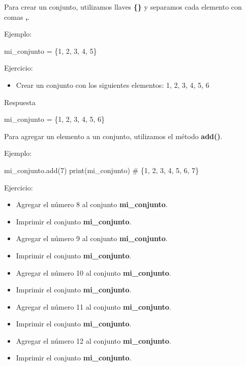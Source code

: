 \documentclass[
  a4paper,
  DIV=11,
  numbers=noendperiod,
  onepage,
  openany]{scrreprt}
\newenvironment{Shaded}{\begin{snugshade}}{\end{snugshade}}
\newcommand{\BuiltInTok}[1]{\textcolor[rgb]{0.00,0.23,0.31}{#1}}
\newcommand{\CommentTok}[1]{\textcolor[rgb]{0.37,0.37,0.37}{#1}}
\newcommand{\DecValTok}[1]{\textcolor[rgb]{0.68,0.00,0.00}{#1}}
\newcommand{\NormalTok}[1]{\textcolor[rgb]{0.00,0.23,0.31}{#1}}
\newcommand{\OperatorTok}[1]{\textcolor[rgb]{0.37,0.37,0.37}{#1}}
\providecommand{\tightlist}{%
  \setlength{\itemsep}{0pt}\setlength{\parskip}{0pt}}\usepackage{longtable,booktabs,array}
\begin{document}
Para crear un conjunto, utilizamos llaves \textbf{\{\}} y separamos cada
elemento con comas \textbf{,}.

Ejemplo:

\begin{Shaded}
\begin{Highlighting}[]
\NormalTok{mi\_conjunto }\OperatorTok{=}\NormalTok{ \{}\DecValTok{1}\NormalTok{, }\DecValTok{2}\NormalTok{, }\DecValTok{3}\NormalTok{, }\DecValTok{4}\NormalTok{, }\DecValTok{5}\NormalTok{\}}
\end{Highlighting}
\end{Shaded}

Ejercicio:

\begin{itemize}
\tightlist
\item
  Crear un conjunto con los siguientes elementos: 1, 2, 3, 4, 5, 6
\end{itemize}

Respuesta

\begin{Shaded}
\begin{Highlighting}[]
\NormalTok{mi\_conjunto }\OperatorTok{=}\NormalTok{ \{}\DecValTok{1}\NormalTok{, }\DecValTok{2}\NormalTok{, }\DecValTok{3}\NormalTok{, }\DecValTok{4}\NormalTok{, }\DecValTok{5}\NormalTok{, }\DecValTok{6}\NormalTok{\}}
\end{Highlighting}
\end{Shaded}

Para agregar un elemento a un conjunto, utilizamos el método
\textbf{add()}.

Ejemplo:

\begin{Shaded}
\begin{Highlighting}[]
\NormalTok{mi\_conjunto.add(}\DecValTok{7}\NormalTok{)}
\BuiltInTok{print}\NormalTok{(mi\_conjunto)  }\CommentTok{\# \{1, 2, 3, 4, 5, 6, 7\}}
\end{Highlighting}
\end{Shaded}

Ejercicio:

\begin{itemize}
\tightlist
\item
  Agregar el número 8 al conjunto \textbf{mi\_conjunto}.
\item
  Imprimir el conjunto \textbf{mi\_conjunto}.
\item
  Agregar el número 9 al conjunto \textbf{mi\_conjunto}.
\item
  Imprimir el conjunto \textbf{mi\_conjunto}.
\item
  Agregar el número 10 al conjunto \textbf{mi\_conjunto}.
\item
  Imprimir el conjunto \textbf{mi\_conjunto}.
\item
  Agregar el número 11 al conjunto \textbf{mi\_conjunto}.
\item
  Imprimir el conjunto \textbf{mi\_conjunto}.
\item
  Agregar el número 12 al conjunto \textbf{mi\_conjunto}.
\item
  Imprimir el conjunto \textbf{mi\_conjunto}.
\end{itemize}
\end{document}
